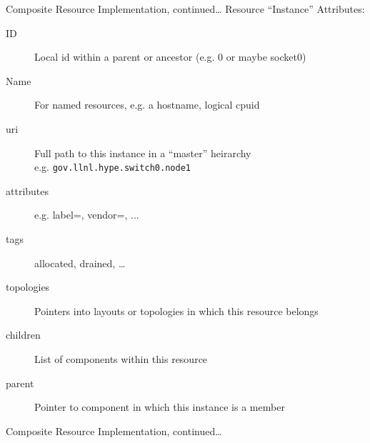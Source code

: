 \documentclass{beamer}
\begin{document}
\begin{frame}{Composite Resource Implementation, continued\ldots}
{\centering Resource ``Instance'' Attributes:}
\begin{description}
 \item[ID] Local id within a parent or ancestor (e.g. $0$ or maybe socket$0$)
 \item[Name] For named resources, e.g. a hostname, logical cpuid
 \item[uri]  Full path to this instance in a ``master'' heirarchy \\
             e.g. {\tt gov.llnl.hype.switch0.node1 }
 \item[attributes] e.g. label=, vendor=, ...
 \item[tags] allocated, drained, \ldots
 \item[topologies] Pointers into layouts or topologies in which this resource
                    belongs
 \item[children] List of components within this resource
 \item[parent]   Pointer to component in which this instance is a member
\end{description}
\end{frame}

\begin{frame}[fragile]{Composite Resource Implementation, continued\ldots}
\centering
{}
\end{frame}
\end{document}
